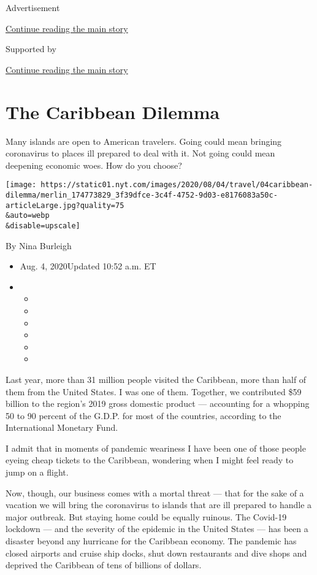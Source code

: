 Advertisement

\protect\hyperlink{after-top}{Continue reading the main story}

Supported by

\protect\hyperlink{after-sponsor}{Continue reading the main story}

\hypertarget{the-caribbean-dilemma}{%
\section{The Caribbean Dilemma}\label{the-caribbean-dilemma}}

Many islands are open to American travelers. Going could mean bringing
coronavirus to places ill prepared to deal with it. Not going could mean
deepening economic woes. How do you choose?

\texttt{[image: https://static01.nyt.com/images/2020/08/04/travel/04caribbean-dilemma/merlin\_174773829\_3f39dfce-3c4f-4752-9d03-e8176083a50c-articleLarge.jpg?quality=75\\\&auto=webp\\\&disable=upscale]}

By Nina Burleigh

\begin{itemize}
\item
  Aug. 4, 2020Updated 10:52 a.m. ET
\item
  \begin{itemize}
  \item
  \item
  \item
  \item
  \item
  \item
  \end{itemize}
\end{itemize}

Last year, more than 31 million people visited the Caribbean, more than
half of them from the United States. I was one of them. Together, we
contributed \$59 billion to the region's 2019 gross domestic product ---
accounting for a whopping 50 to 90 percent of the G.D.P. for most of the
countries, according to the International Monetary Fund.

I admit that in moments of pandemic weariness I have been one of those
people eyeing cheap tickets to the Caribbean, wondering when I might
feel ready to jump on a flight.

Now, though, our business comes with a mortal threat --- that for the
sake of a vacation we will bring the coronavirus to islands that are ill
prepared to handle a major outbreak. But staying home could be equally
ruinous. The Covid-19 lockdown --- and the severity of the epidemic in
the United States --- has been a disaster beyond any hurricane for the
Caribbean economy. The pandemic has closed airports and cruise ship
docks, shut down restaurants and dive shops and deprived the Caribbean
of tens of billions of dollars.

